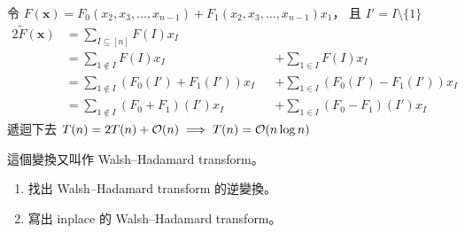 \documentclass[standalone]{beamer}
\begin{document}
\begin{frame}{}
  令 $F(\bm{x}) = F_0(x_2, x_3, \dots, x_{n-1}) + F_1(x_2, x_3, \dots, x_{n-1}) x_1$，
  且 $I' = I \setminus \{1\}$
  \begin{alignat*}{2}
    \tilde{F}(\bm{x}) &= \sum_{I \subseteq [n]} F(I) x_I && \\
    &= \sum_{1 \not\in I} F(I) x_I &&+ \sum_{1 \in I} F(I) x_I \\
    &= \sum_{1 \not\in I} (F_0(I') + F_1(I')) x_I &&+ \sum_{1 \in I} (F_0(I') - F_1(I')) x_I \\
    &= \sum_{1 \not\in I} (F_0 + F_1)(I') x_I &&+ \sum_{1 \in I} (F_0 - F_1)(I') x_I
  \end{alignat*}
  遞迴下去 $T(n) = 2T(n) + \mathcal{O}(n) \implies T(n) = \mathcal{O}(n \log n)$
\end{frame}

\begin{frame}{}
  這個變換又叫作 Walsh–Hadamard transform。
  \begin{exercise}
    \begin{enumerate}
      \item 找出 Walsh–Hadamard transform 的逆變換。
      \item 寫出 inplace 的 Walsh–Hadamard transform。
    \end{enumerate}
  \end{exercise}
\end{frame}
\end{document}
